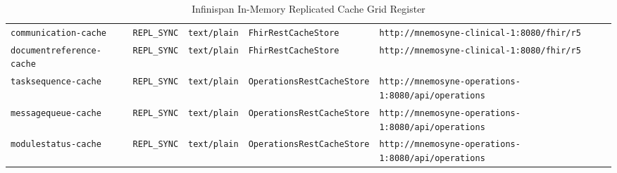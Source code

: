 \begin{table}[htbp]
\begin{tabularx}{\textwidth}{l l l l Y}
\texttt{communication-cache} & \texttt{REPL\_SYNC} & \texttt{text/plain} & \texttt{FhirRestCacheStore} & \nolinkurl{http://mnemosyne-clinical-1:8080/fhir/r5} \\
\texttt{documentreference-cache} & \texttt{REPL\_SYNC} & \texttt{text/plain} & \texttt{FhirRestCacheStore} & \nolinkurl{http://mnemosyne-clinical-1:8080/fhir/r5} \\
\midrule
\texttt{tasksequence-cache} & \texttt{REPL\_SYNC} & \texttt{text/plain} & \texttt{OperationsRestCacheStore} & \nolinkurl{http://mnemosyne-operations-1:8080/api/operations} \\
\texttt{messagequeue-cache} & \texttt{REPL\_SYNC} & \texttt{text/plain} & \texttt{OperationsRestCacheStore} & \nolinkurl{http://mnemosyne-operations-1:8080/api/operations} \\
\texttt{modulestatus-cache} & \texttt{REPL\_SYNC} & \texttt{text/plain} & \texttt{OperationsRestCacheStore} & \nolinkurl{http://mnemosyne-operations-1:8080/api/operations} \\
\bottomrule
\end{tabularx}
\caption{Infinispan In-Memory Replicated Cache Grid Register}
\label{tab:persistence_cache_register}
\end{table}

\newpage
